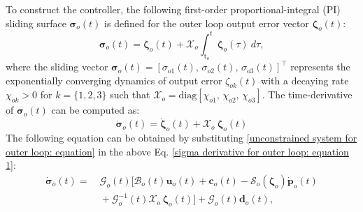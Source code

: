 \documentclass[lettersize,journal]{IEEEtran}
\begin{document}
To construct the controller, the following first-order proportional-integral (PI) sliding surface $\boldsymbol{\sigma}_o(t)$ is defined for the outer loop output error vector $\boldsymbol{\zeta}_o(t)$:
\begin{equation} \label{sigma for outer loop: equation}
    \boldsymbol{\sigma}_o(t) = \boldsymbol{\zeta}_o(t) + \mathcal{X}_o \int_{\text{t}_o}^t \boldsymbol{\zeta}_o(\tau)~d\tau,
\end{equation}
where the sliding vector $\boldsymbol{\sigma}_o(t)  = [\sigma_{o 1}(t),\, \sigma_{o 2}(t),\, \sigma_{o 3}(t)]^{\top}$ represents the exponentially converging dynamics of output error $\zeta_{o k}(t)$ with a decaying rate $\chi_{o k} > 0$ for $k = \{1, 2, 3\}$ such that $\mathcal{X}_o = \text{diag}[\chi_{o 1},\, \chi_{o 2},\, \chi_{o 3}]$.
The time-derivative of $\boldsymbol{\sigma}_o(t)$ can be computed as:
\begin{equation} \label{sigma derivative for outer loop: equation 1}
    \dot{\boldsymbol{\sigma}}_o(t) = \dot{\boldsymbol{\zeta}}_o(t) + \mathcal{X}_o~\boldsymbol{\zeta}_o(t)
\end{equation}
The following equation can be obtained by substituting  \eqref{unconstrained system for outer loop: equation} in the above Eq. \eqref{sigma derivative for outer loop: equation 1}:
\begin{align}
    \label{sigma derivative for outer loop: equation 2}
    \dot{\boldsymbol{\sigma}}_o(t) = &~ \mathcal{G}_o(t) \big[ \mathcal{B}_o(t)\boldsymbol{u}_o(t) + \boldsymbol{c}_o(t) - \mathcal{S}_o(\boldsymbol{\zeta}_o) \dot{\boldsymbol{p}}_o(t) \nonumber \\ 
    & ~ + \mathcal{G}_o^{-1}(t) \mathcal{X}_o\,\boldsymbol{\zeta}_o(t) \big] + \mathcal{G}_o(t) \boldsymbol{d}_o(t), 
\end{align}
 
\end{document}
